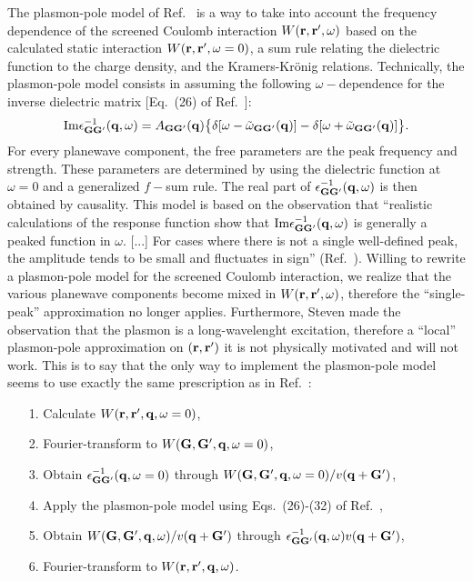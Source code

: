 \documentclass[12pt]{article}
\def\G{{\bf G}}
\def\Gp{{\bf G}^\prime}
\def\q{{\bf q}}
\def\r{{\bf r}}
\def\rp{{\bf r}^\prime}
\def\w{\omega}
\begin{document}
The plasmon-pole model of Ref.\ \cite{hl86} is a way to take into account the frequency dependence of the
screened Coulomb interaction $W(\r,\rp,\w)$ based on the calculated static interaction $W(\r,\rp,\w=0)$,
a sum rule relating the dielectric function to the charge density, and the Kramers-Kr\"onig relations.
%
Technically, the plasmon-pole model consists in assuming the following $\w-$dependence for the inverse
dielectric matrix [Eq.\ (26) of Ref.\ \cite{hl86}]:
  \begin{equation}
  {\rm Im} \epsilon^{-1}_{\G\Gp}(\q,\w) = A_{\G\Gp}(\q) \big\{ \delta [ \w -\tilde{\w}_{\G\Gp}(\q) ] - \delta [ \w +\tilde{\w}_{\G\Gp}(\q) ] \big\}.
  \end{equation}
For every planewave component, the free parameters are the peak frequency and strength. These parameters
are determined by using the dielectric function at $\w=0$ and a generalized $f-$sum rule.
The real part of $\epsilon^{-1}_{\G\Gp}(\q,\w)$ is then obtained by causality.
This model is based on the observation that ``realistic calculations of the response function show that
${\rm Im} \epsilon^{-1}_{\G\Gp}(\q,\w)$ is generally a peaked function in $\w$. [...] For cases where
there is not a single well-defined peak, the amplitude tends to be small and fluctuates in sign'' (Ref.\ \cite{hl86}).
%
Willing to rewrite a plasmon-pole model for the screened Coulomb interaction, we realize that the various
planewave components become mixed in $W(\r,\rp,\w)$, therefore the ``single-peak'' approximation no longer applies.
Furthermore, Steven made the observation that the plasmon is a long-wavelenght excitation, therefore
a ``local'' plasmon-pole approximation on $(\r,\rp)$ it is not physically motivated and will not work.
%
This is to say that the only way to implement the plasmon-pole model seems to use exactly the same prescription
as in Ref.\ \cite{hl86}:
\begin{itemize}
\item[1.]
Calculate $W(\r,\rp,\q,\w=0)$,
\item[2.]
Fourier-transform to  $W(\G,\Gp,\q,\w=0)$,
\item[3.]
Obtain $\epsilon^{-1}_{\G\Gp}(\q,\w=0)$ through $W(\G,\Gp,\q,\w=0)/v(\q+\Gp)$,
\item[4.]
Apply the plasmon-pole model using Eqs.\ (26)-(32) of Ref.\ \cite{hl86},
\item[5.]
Obtain $W(\G,\Gp,\q,\w)/v(\q+\Gp)$ through $\epsilon^{-1}_{\G\Gp}(\q,\w)v(\q+\Gp)$,
\item[6.]
Fourier-transform to $W(\r,\rp,\q,\w)$.
\end{itemize}
\end{document}

